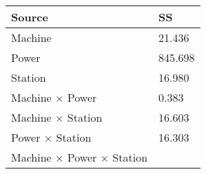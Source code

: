 \documentclass[12pt,]{article}
\begin{document}
\begin{longtable}[]{@{}ll@{}}
\toprule
\begin{minipage}[b]{0.35\columnwidth}\raggedright
Source\strut
\end{minipage} & \begin{minipage}[b]{0.13\columnwidth}\raggedright
SS\strut
\end{minipage}\tabularnewline
\midrule
\endhead
\begin{minipage}[t]{0.35\columnwidth}\raggedright
Machine\strut
\end{minipage} & \begin{minipage}[t]{0.13\columnwidth}\raggedright
21.436\strut
\end{minipage}\tabularnewline
\begin{minipage}[t]{0.35\columnwidth}\raggedright
Power\strut
\end{minipage} & \begin{minipage}[t]{0.13\columnwidth}\raggedright
845.698\strut
\end{minipage}\tabularnewline
\begin{minipage}[t]{0.35\columnwidth}\raggedright
Station\strut
\end{minipage} & \begin{minipage}[t]{0.13\columnwidth}\raggedright
16.980\strut
\end{minipage}\tabularnewline
\begin{minipage}[t]{0.35\columnwidth}\raggedright
Machine × Power\strut
\end{minipage} & \begin{minipage}[t]{0.13\columnwidth}\raggedright
0.383\strut
\end{minipage}\tabularnewline
\begin{minipage}[t]{0.35\columnwidth}\raggedright
Machine × Station\strut
\end{minipage} & \begin{minipage}[t]{0.13\columnwidth}\raggedright
16.603\strut
\end{minipage}\tabularnewline
\begin{minipage}[t]{0.35\columnwidth}\raggedright
Power × Station\strut
\end{minipage} & \begin{minipage}[t]{0.13\columnwidth}\raggedright
16.303\strut
\end{minipage}\tabularnewline
\begin{minipage}[t]{0.35\columnwidth}\raggedright
Machine × Power × Station\strut
\end{minipage} & \begin{minipage}[t]{0.13\columnwidth}\raggedright

\end{minipage}
\end{longtable}
\end{document}

